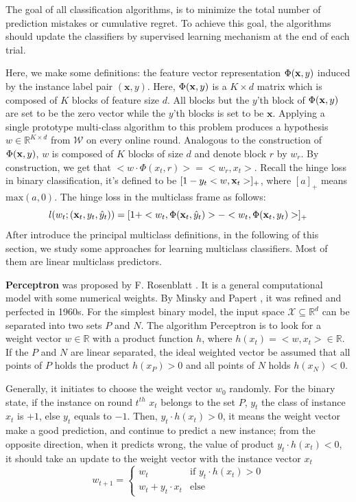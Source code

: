 The goal of all classification algorithms, is to minimize the total number of prediction mistakes or cumulative regret. To achieve this goal, the algorithms should update the classifiers by supervised learning mechanism at the end of each trial. 

Here, we make some definitions:  the feature vector representation $\Phi(\mathbf{x},y)$ induced by the instance label pair $(\mathbf{x},y)$. Here, $\Phi(\mathbf{x},y)$ is a $K\times d$ matrix which is composed of $K$ blocks of feature size $d$. All blocks but the $y$'th block of $\Phi(\mathbf{x},y)$ are set to be the zero vector while the $y$'th blocks is set to be $\mathbf{x}$. Applying a single prototype multi-class algorithm to this problem produces a hypothesis $w \in \mathbb{R}^{K\times d}$ from $\mathscr{W}$ on every online round. Analogous to the construction of $\Phi(\mathbf{x},y)$, $w$ is composed of $K$ blocks of size $d$ and denote block $r$ by $w_r$. By construction, we get that $<w \cdot \Phi(x_t,r) >= <w_r, x_t>$. Recall the hinge loss in binary classification, it's defined to be $[1-y_t<w,\mathbf{x}_t>]_+$, where $[a]_+$ means $\text{max}(a,0)$. The hinge loss in the multiclass frame as follows:
\begin{equation}
\label{equa:hingelossML}
l(w_t;(\mathbf{x}_t,y_t,\hat{y}_t)) = [1+ <w_t, \Phi(\mathbf{x}_t,\hat{y}_t)> - <w_t, \Phi(\mathbf{x}_t,y_t)>]_+
\end{equation}
After introduce the principal multiclass definitions, in the following of this section, we study some approaches for learning multiclass classifiers. Most of them are linear multiclass predictors. 

\vspace{3ex}
\textbf{Perceptron} was proposed by F. Rosenblatt \cite{rosenblatt1958perceptron}. It is a general computational model with some numerical weights. By Minsky and Papert \cite{minsky1987perceptrons}, it was refined and perfected in 1960s.  For the simplest binary model, the input space $\mathscr{X}\subseteq \mathbb{R}^d$ can be separated into two sets $P$ and $N$. The algorithm Perceptron is to look for a weight vector $w\in \mathbb{R}$ with a product function $h$, where $h(x_t) = <w,x_t> \in \mathbb{R}$. If the $P$ and $N$ are linear separated, the ideal weighted vector be assumed that all points of $P$ holds the product $h(x_P) > 0$ and all points of $N$ holds $h(x_N) < 0$. 

Generally, it initiates to choose the weight vector $w_0$ randomly. For the binary state, if the instance on round $t^{th}$ $x_t$ belongs to the set $P$,  $y_t$ the class of instance $x_t$ is $+1$, else $y_t$ equals to $-1$. Then, $y_t\cdot h(x_t) > 0$, it means the weight vector make a good prediction, and continue to predict a new instance; from the opposite direction, when it predicts wrong, the value of product $y_t \cdot h(x_t) <0$, it should take an update to the weight vector with the instance vector $x_t$
\[w_{t+1} = \begin{cases}
 w_t & \text{if } y_t \cdot h(x_t) >0\\ 
 w_t + y_t\cdot x_t & \text{else}
\end{cases} \]

